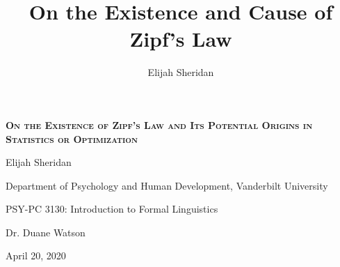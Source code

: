 \documentclass[10pt]{article}
\title{On the Existence and Cause of Zipf's Law}
\author{Elijah Sheridan}
\begin{document}
\pagestyle{fancy}
\rhead{\thepage}  %
\cfoot{}

\setlength{\abovedisplayskip}{4pt}
\setlength{\belowdisplayskip}{4pt}

\begin{titlepage}
	\centering
	\vspace*{2.75cm}
	{\scshape \LARGE \textbf{On the Existence of Zipf's Law and Its Potential Origins in Statistics or Optimization} \par}
	\vspace*{1.25cm}
	{Elijah Sheridan \par}
	
	{Department of Psychology and Human Development, Vanderbilt University \par}
	
	{PSY-PC 3130: Introduction to Formal Linguistics \par}

	{Dr. Duane Watson \par}

	{April 20, 2020 \par}
\end{titlepage}
\end{document}
